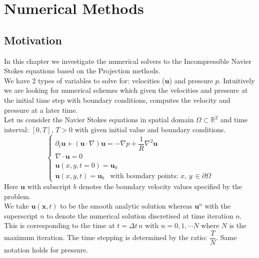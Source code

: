 \chapter{Numerical Methods}
\label{chapter4}
\section{Motivation}
In this chapter we investigate the numerical solvers to the Incompressible Navier Stokes equations based on the Projection methods.\\

We have 2 types of variables to solve for: velocities ($\textbf{u}$) and pressure $p$. Intuitively we are looking for numerical schemes which given the velocities and pressure at the initial time step with boundary conditions, computes the velocity and pressure at a later time.\\

Let us consider the Navier Stokes equations in spatial domain $\Omega \subset \mathbb{R}^2$ and time interval: $[0,T],\,T>0$ with given initial value and boundary conditions.
\begin{equation}
\begin{cases}
\partial_t \textbf{u} + (\textbf{u} \cdot \nabla)\textbf{u} = -\nabla p + \dfrac{1}{R}\nabla^2\textbf{u}\\
\nabla \cdot \textbf{u}=0\\
\textbf{u}(x,y,t=0) = \textbf{u}_0\\
\textbf{u}(x,y,t) = \textbf{u}_b\,\,\,\text{   with boundary points: $x,\,y\,\in \partial\Omega$}
\end{cases}
\end{equation} 
Here $\textbf{u}$ with subscript $b$ denotes the boundary velocity values specified by the problem.\\

We take $\textbf{u}(\textbf{x},t)$ to be the smooth analytic solution whereas $\textbf{u}^n$ with the superscript $n$ to denote the numerical solution discretised at time iteration $n$. This is corresponding to the time at $t = \Delta t\,n$ with $n = 0,1,\cdots N$ where $N$ is the maximum iteration. The time stepping is determined by the ratio: $\dfrac{T}{N}$. Same notation holds for pressure.\\

